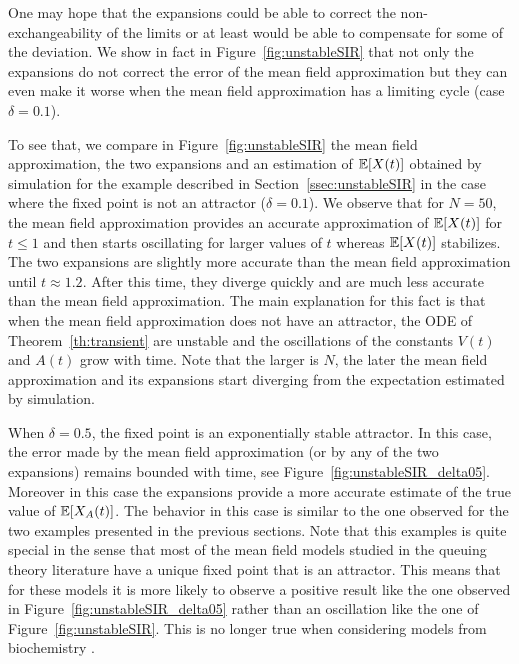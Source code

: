 \documentclass[sigconf]{acmart}
\newcommand\esp[1]{{\mathchoice{\besp{#1}}{\sesp{#1}}{\sesp{#1}}{\sesp{#1}}}}
\newcommand\besp[1]{\mathbb{E}\left[#1\right]}
\newcommand\sesp[1]{\mathbb{E}[#1]}
\begin{document}
One may hope that the expansions could be able to correct the
non-exchangeability of the limits or at least would be able to
compensate for some of the deviation.  We show in fact in
Figure~\ref{fig:unstableSIR} that not only the expansions do not
correct the error of the mean field approximation but they can even
make it worse when the mean field approximation has a limiting cycle
(case $\delta=0.1$). 

To see that, we compare in Figure~\ref{fig:unstableSIR} the mean field
approximation, the two expansions and an estimation of $\esp{X(t)}$
obtained by simulation for the example described in
Section~\ref{ssec:unstableSIR} in the case where the fixed point is
not an attractor ($\delta=0.1$). We observe that for $N=50$, the mean
field approximation provides an accurate approximation of $\esp{X(t)}$
for $t\le1$ and then starts oscillating for larger values of $t$
whereas $\esp{X(t)}$ stabilizes. The two expansions are slightly more
accurate than the mean field approximation until $t\approx1.2$. After
this time, they diverge quickly and are much less accurate than the
mean field approximation. The main explanation for this fact is that
when the mean field approximation does not have an attractor, the ODE
of Theorem~\ref{th:transient} are unstable and the oscillations of the
constants $V(t)$ and $A(t)$ grow with time. Note that the larger is
$N$, the later the mean field approximation and its expansions start
diverging from the expectation estimated by simulation.




When $\delta=0.5$, the fixed point is an exponentially stable
attractor. In this case, the error made by the mean field
approximation (or by any of the two expansions) remains bounded with
time, see Figure~\ref{fig:unstableSIR_delta05}. Moreover in this case
the expansions provide a more accurate estimate of the true value of
$\esp{X_A(t)}$.  The behavior in this case is similar to the one
observed for the two examples presented in the previous sections.
Note that this examples is quite special in the sense that most of the
mean field models studied in the queuing theory literature have a
unique fixed point that is an attractor. This means that for these
models it is more likely to observe a positive result like the one
observed in Figure~\ref{fig:unstableSIR_delta05} rather than an
oscillation like the one of Figure~\ref{fig:unstableSIR}. This is no
longer true when considering models from biochemistry \cite{wilkinson_stochastic_2011}. 
\end{document}
